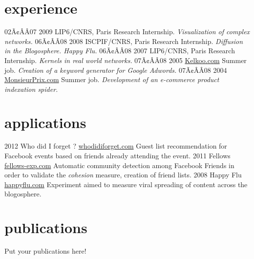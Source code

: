 \documentclass[]{friggeri-cv}
\begin{document}
\section{experience}

\begin{entrylist}
  \entry
    {02Ã¢ÂÂ07 2009}
    {LIP6/CNRS, Paris}
    {Research Internship.}
    {\emph{Visualization of complex networks.}}
  \entry
    {06Ã¢ÂÂ08 2008}
    {ISCPIF/CNRS, Paris}
    {Research Internship.}
    {\emph{Diffusion in the Blogosphere. Happy Flu.}}
  \entry
    {06Ã¢ÂÂ08 2007}
    {LIP6/CNRS, Paris}
    {Research Internship.}
    {\emph{Kernels in real world networks.}}
  \entry
    {07Ã¢ÂÂ08 2005}
    {\href{http://www.kelkoo.com}{Kelkoo.com}}
    {Summer job.}
    {\emph{Creation of a keyword generator for Google Adwords.}}
  \entry
    {07Ã¢ÂÂ08 2004}
    {\href{http://www.monsieurprix.com}{MonsieurPrix.com}}
    {Summer job.}
    {\emph{Development of an e-commerce product indexation spider.}}
\end{entrylist}

\section{applications}

\begin{entrylist}
  \entry
    {2012}
    {Who did I forget ?}
    {\href{http://whodidiforget.com}{whodidiforget.com}}
    {Guest list recommendation for Facebook events based on friends already attending the event.}
  \entry
    {2011}
    {Fellows}
    {\href{http://fellows-exp.com}{fellows-exp.com}}
    {Automatic community detection among Facebook Friends in order to validate the \emph{cohesion} measure, creation of friend lists.}
  \entry
    {2008}
    {Happy Flu}
    {\href{http://happyflu.com}{happyflu.com}}
    {Experiment aimed to measure viral spreading of content across the blogosphere.}
\end{entrylist}

\section{publications}

Put your publications here!

% 
\end{document}
